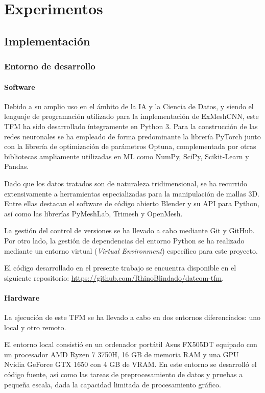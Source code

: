 \chapter{Experimentos}

\section{Implementación}
\label{section4:implementation}
\subsection{Entorno de desarrollo}
\subsubsection{Software}
Debido a su amplio uso en el ámbito de la IA y la Ciencia de Datos, y siendo el lenguaje de programación utilizado para la implementación de ExMeshCNN, este TFM ha sido desarrollado íntegramente en Python 3. Para la construcción de las redes neuronales se ha empleado de forma predominante la librería PyTorch junto con la librería de optimización de parámetros Optuna, complementada por otras bibliotecas ampliamente utilizadas en ML como NumPy, SciPy, Scikit-Learn y Pandas.

Dado que los datos tratados son de naturaleza tridimensional, se ha recurrido extensivamente a herramientas especializadas para la manipulación de mallas 3D. Entre ellas destacan el software de código abierto Blender y su API para Python, así como las librerías PyMeshLab, Trimesh y OpenMesh.

La gestión del control de versiones se ha llevado a cabo mediante Git y GitHub. Por otro lado, la gestión de dependencias del entorno Python se ha realizado mediante un entorno virtual (\textit{Virtual Environment}) específico para este proyecto.

El código desarrollado en el presente trabajo se encuentra disponible en el siguiente repositorio: \url{https://github.com/RhinoBlindado/datcom-tfm}.

\subsubsection{Hardware}
La ejecución de este TFM se ha llevado a cabo en dos entornos diferenciados: uno local y otro remoto.

El entorno local consistió en un ordenador portátil Asus FX505DT equipado con un procesador AMD Ryzen 7 3750H, 16 GB de memoria RAM y una GPU Nvidia GeForce GTX 1650 con 4 GB de VRAM. En este entorno se desarrolló el código fuente, así como las tareas de preprocesamiento de datos y pruebas a pequeña escala, dada la capacidad limitada de procesamiento gráfico.

